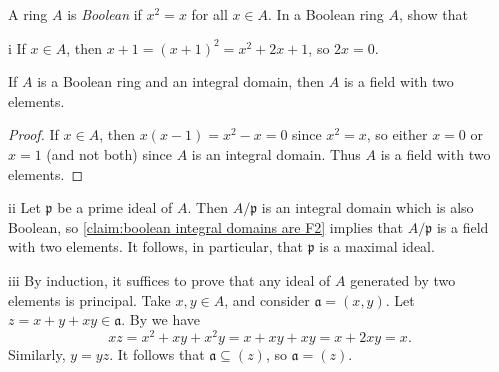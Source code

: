 \begin{exercise}
A ring \(A\) is \emph{Boolean} if \(x^2 = x\) for all \(x \in A\).
In a Boolean ring \(A\), show that
\end{exercise}

\begin{partsolution}{i}
If \(x \in A\), then \(x + 1 = \left(x + 1\right)^2 = x^2 + 2 x + 1\), so \(2 x = 0\).
\end{partsolution}

\begin{claim}
\label{claim:boolean integral domains are F2}
If \(A\) is a Boolean ring and an integral domain, then \(A\) is a field with two elements.
\end{claim}

\begin{proof}
If \(x \in A\), then \(x(x - 1) = x^2 - x = 0\) since \(x^2 = x\), so either \(x = 0\) or \(x = 1\) (and not both) since \(A\) is an integral domain.
Thus \(A\) is a field with two elements.
\end{proof}

\begin{partsolution}{ii}
Let \(\mathfrak{p}\) be a prime ideal of \(A\).
Then \(A / \mathfrak{p}\) is an integral domain which is also Boolean, so \autoref{claim:boolean integral domains are F2} implies that \(A / \mathfrak{p}\) is a field with two elements.
It follows, in particular, that \(\mathfrak{p}\) is a maximal ideal.
\end{partsolution}

\begin{partsolution}{iii}
By induction, it suffices to prove that any ideal of \(A\) generated by two elements is principal.
Take \(x, y \in A\), and consider \(\mathfrak{a} = (x ,y)\).
Let \(z = x + y + x y \in \mathfrak{a}\).
By  we have
\begin{equation*}
x z =
x^2 + x y + x^2 y
= x + x y + x y
= x + 2 x y
= x.
\end{equation*}
Similarly, \(y = y z\).
It follows that \(\mathfrak{a} \subseteq (z)\), so \(\mathfrak{a} = (z)\).
\end{partsolution}